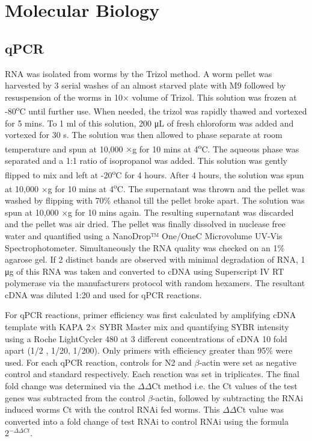 \section{Molecular Biology}

\subsection{qPCR}

RNA was isolated from worms by the Trizol method. A worm pellet was harvested by 3 serial washes of an almost starved plate with M9 followed by resuspension of the worms in 10$\times$ volume of Trizol. This solution was frozen at -80\textsuperscript{o}C until further use. When needed, the trizol was rapidly thawed and vortexed for 5 mins. To 1 ml of this solution, 200 μL of fresh chloroform was added and vortexed for 30 s. The solution was then allowed to phase separate at room temperature and spun at 10,000 $\times$g for 10 mins at 4\textsuperscript{o}C. The aqueous phase was separated and a 1:1 ratio of isopropanol was added. This solution was gently flipped to mix and left at -20\textsuperscript{o}C for 4 hours. After 4 hours, the solution was spun at 10,000 $\times$g for 10 mins at 4\textsuperscript{o}C. The supernatant was thrown and the pellet was washed by flipping with 70\% ethanol till the pellet broke apart. The solution was spun at 10,000 $\times$g for 10 mins again. The resulting supernatant was discarded and the pellet was air dried. The pellet was finally dissolved in nuclease free water and quantified using a NanoDrop™ One/OneC Microvolume UV-Vis Spectrophotometer. Simultaneously the RNA quality was checked on an 1\% agarose gel. If 2 distinct bands are observed with minimal degradation of RNA, 1 μg of this RNA was taken and converted to cDNA using Superscript IV RT polymerase via the manufacturers protocol with random hexamers. The resultant cDNA was diluted 1:20 and used for qPCR reactions.

For qPCR reactions, primer efficiency was first calculated by amplifying cDNA template with KAPA 2$\times$ SYBR Master mix and quantifying SYBR intensity using a Roche LightCycler 480 at 3 different concentrations of cDNA 10 fold apart (1/2 , 1/20, 1/200). Only primers with efficiency greater than 95\% were used. For each qPCR reaction, controls for N2 and $\beta$-actin were set as negative control and standard respectively. Each reaction was set in triplicates. The final fold change was determined via the $\Delta \Delta$Ct method i.e. the Ct values of the test genes was subtracted from the control $\beta$-actin, followed by subtracting the RNAi induced worms Ct with the control RNAi fed worms. This $\Delta \Delta$Ct value was converted into a fold change of test RNAi to control RNAi using the formula $2^{-\Delta \Delta Ct}$.


